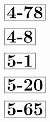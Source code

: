 \documentclass[a4paper, 10pt]{article}
\begin{document}
\begin{minipage}[t]{0.15\textwidth}
                \vspace*{-1.59cm}
        \hspace*{0.75cm}
        $\boxed{\textbf{\Huge4-78}}$
\end{minipage}
\begin{minipage}[t]{0.85\textwidth}
    
\end{minipage}

\begin{minipage}[t]{0.15\textwidth}
                \vspace*{-1.59cm}
        \hspace*{1.25cm}
        $\boxed{\textbf{\Huge4-8}}$
\end{minipage}
\begin{minipage}[t]{0.85\textwidth}
    
\end{minipage}

\begin{minipage}[t]{0.15\textwidth}
                \vspace*{-1.59cm}
        \hspace*{1.25cm}
        $\boxed{\textbf{\Huge5-1}}$
\end{minipage}
\begin{minipage}[t]{0.85\textwidth}
    
\end{minipage}

\begin{minipage}[t]{0.15\textwidth}
                \vspace*{-1.59cm}
        \hspace*{0.75cm}
        $\boxed{\textbf{\Huge5-20}}$
\end{minipage}
\begin{minipage}[t]{0.85\textwidth}
    
\end{minipage}

\begin{minipage}[t]{0.15\textwidth}
                \vspace*{-1.59cm}
        \hspace*{0.75cm}
        $\boxed{\textbf{\Huge5-65}}$
\end{minipage}
\begin{minipage}[t]{0.85\textwidth}
    
\end{minipage}
\end{document}
